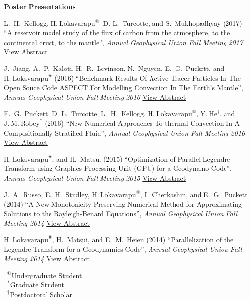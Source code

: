 \documentclass[11pt]{ltxdoc}
\begin{document}
\noindent
\textbf{\underline{Poster Presentations}}


\hangindent 20pt
L.~H.~Kellogg, $\mathrm{H.~Lokavarapu}^{@}$, D. L.~Turcotte, and S.~Mukhopadhyay (2017) 
``A reservoir model study of the flux of carbon from the atmosphere, to the continental crust, to the mantle'', 
\textit{Annual Geophysical Union Fall Meeting 2017}
\href{http://adsabs.harvard.edu/abs/2017AGUFMDI14A..06K}{View Abstract}

\hangindent 20pt
J.~Jiang, A.~P.~Kaloti, H.~R.~Levinson, N.~Nguyen, E.~G.~Puckett, and $\mathrm{H.~Lokavarapu}^{@}$ (2016) 
``Benchmark Results Of Active Tracer Particles In The Open Souce Code ASPECT For Modelling Convection In The Earth's Mantle'', 
\textit{Annual Geophysical Union Fall Meeting 2016}
\href{http://adsabs.harvard.edu/abs/2016AGUFM.T23C2946J}{View Abstract}

\hangindent 20pt
E.~G.~Puckett, D. L.~Turcotte, L.~H.~Kellogg, $\mathrm{H.~Lokavarapu}^{@}$,  $\mathrm{Y.~He}^{\dagger}$, and $\mathrm{J.~M.~Robey}^{*}$ (2016) 
``New Numerical Approaches To thermal Convection In A Compositionally Stratified Fluid'', 
\textit{Annual Geophysical Union Fall Meeting 2016}
\href{http://adsabs.harvard.edu/abs/2016AGUFMDI23A2589P}{View Abstract}

\hangindent 20pt
$\mathrm{H.~Lokavarapu}^{@}$, and H.~Matsui (2015) 
``Optimization of Parallel Legendre Transform using Graphics Processing Unit (GPU) for a Geodynamo Code'', 
\textit{Annual Geophysical Union Fall Meeting 2015}
\href{http://adsabs.harvard.edu/abs/2015AGUFMGP43B1253L}{View Abstract}

\hangindent 20pt
J.~A.~Russo, E.~H.~Studley, $\mathrm{H.~Lokavarapu}^{@}$, I.~Cherkashin, and E.~G.~Puckett (2014) 
``A New Monotonicity-Preserving Numerical Method for Approximating Solutions to the Rayleigh-Benard Equations'', 
\textit{Annual Geophysical Union Fall Meeting 2014}
\href{http://adsabs.harvard.edu/abs/2014AGUFMDI11A4258R}{View Abstract}

\hangindent 20pt
$\mathrm{H.~Lokavarapu}^{@}$, H.~Matsui, and E.~M.~Heien (2014) 
``Parallelization of the Legendre Transform for a Geodynamics Code'', 
\textit{Annual Geophysical Union Fall Meeting 2014}
\href{http://adsabs.harvard.edu/abs/2014AGUFMDI11A4255L}{View Abstract}

\vskip 18pt

$\phantom{0}^@$Undergraduate Student        \\
$\phantom{0}^*$Graduate Student             \\
$\phantom{0}^{\dagger}$Postdoctoral Scholar
\end{document}
